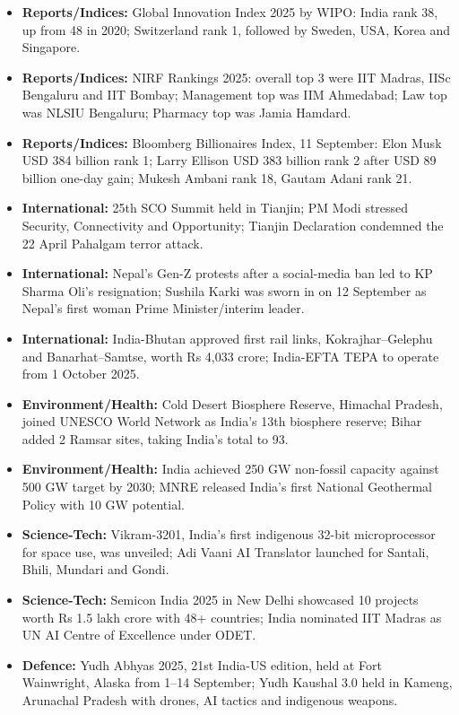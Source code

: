 \documentclass[10pt,a4paper]{article}
\begin{document}
\begin{itemize}
    \item \textbf{Reports/Indices:} Global Innovation Index 2025 by WIPO: India rank 38, up from 48 in 2020; Switzerland rank 1, followed by Sweden, USA, Korea and Singapore.
    \item \textbf{Reports/Indices:} NIRF Rankings 2025: overall top 3 were IIT Madras, IISc Bengaluru and IIT Bombay; Management top was IIM Ahmedabad; Law top was NLSIU Bengaluru; Pharmacy top was Jamia Hamdard.
    \item \textbf{Reports/Indices:} Bloomberg Billionaires Index, 11 September: Elon Musk USD 384 billion rank 1; Larry Ellison USD 383 billion rank 2 after USD 89 billion one-day gain; Mukesh Ambani rank 18, Gautam Adani rank 21.
    \item \textbf{International:} 25th SCO Summit held in Tianjin; PM Modi stressed Security, Connectivity and Opportunity; Tianjin Declaration condemned the 22 April Pahalgam terror attack.
    \item \textbf{International:} Nepal's Gen-Z protests after a social-media ban led to KP Sharma Oli's resignation; Sushila Karki was sworn in on 12 September as Nepal's first woman Prime Minister/interim leader.
    \item \textbf{International:} India-Bhutan approved first rail links, Kokrajhar--Gelephu and Banarhat--Samtse, worth Rs 4,033 crore; India-EFTA TEPA to operate from 1 October 2025.
    \item \textbf{Environment/Health:} Cold Desert Biosphere Reserve, Himachal Pradesh, joined UNESCO World Network as India's 13th biosphere reserve; Bihar added 2 Ramsar sites, taking India's total to 93.
    \item \textbf{Environment/Health:} India achieved 250 GW non-fossil capacity against 500 GW target by 2030; MNRE released India's first National Geothermal Policy with 10 GW potential.
    \item \textbf{Science-Tech:} Vikram-3201, India's first indigenous 32-bit microprocessor for space use, was unveiled; Adi Vaani AI Translator launched for Santali, Bhili, Mundari and Gondi.
    \item \textbf{Science-Tech:} Semicon India 2025 in New Delhi showcased 10 projects worth Rs 1.5 lakh crore with 48+ countries; India nominated IIT Madras as UN AI Centre of Excellence under ODET.
    \item \textbf{Defence:} Yudh Abhyas 2025, 21st India-US edition, held at Fort Wainwright, Alaska from 1--14 September; Yudh Kaushal 3.0 held in Kameng, Arunachal Pradesh with drones, AI tactics and indigenous weapons.

\end{itemize}
\end{document}
